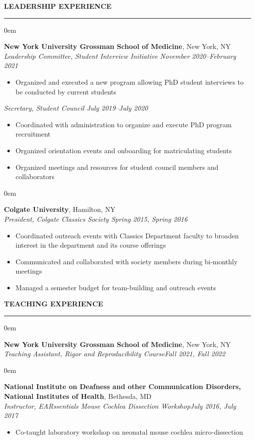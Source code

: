 \documentclass[10pt, letterpaper]{article} %
\newenvironment{CVSection}{
\begin{addmargin}[2em]{0em}
\begin{samepage}}
{\end{samepage}
\end{addmargin}\bigskip}
\newcommand{\CVHeading}[1]{
\MakeUppercase{\bf #1}
\smallskip
\hrule
\medskip
}
\begin{document}
\CVHeading{Leadership Experience}
\begin{CVSection}
\textbf{New York University Grossman School of Medicine}, New York, NY\\
\textsl{Leadership Committee, Student Interview Initiative	\hfill November 2020--February 2021}
\begin{itemize}
\item Organized and executed a new program allowing PhD student interviews to be conducted by current students
\end{itemize}
\medskip
\textsl{Secretary, Student Council	\hfill July 2019--July 2020}
\begin{itemize}
\item Coordinated with administration to organize and execute PhD program recruitment
\item Organized orientation events and onboarding for matriculating students
\item Organized meetings and resources for student council members and collaborators
\end{itemize}
\end{CVSection}
\begin{CVSection}
\textbf{Colgate University}, Hamilton, NY\\
\textsl{President, Colgate Classics Society	\hfill Spring 2015, Spring 2016}
\begin{itemize}
\item Coordinated outreach events with Classics Department faculty to broaden interest in the department and its course offerings
\item Communicated and collaborated with society members during bi-monthly meetings
\item Managed a semester budget for team-building and outreach events
\end{itemize}
\end{CVSection}

\CVHeading{Teaching Experience}
\begin{CVSection}
\textbf{New York University Grossman School of Medicine}, New York, NY\\
\textsl{Teaching Assistant, Rigor and Reproducibility Course\hfill Fall 2021, Fall 2022}

\end{CVSection}
\begin{CVSection}
\textbf{National Institute on Deafness and other Communication Disorders,\\ National Institutes of Health}, Bethesda, MD\\
\textsl{Instructor, EARssentials Mouse Cochlea Dissection Workshop\hfill July 2016, July 2017}
\begin{itemize}
\item Co-taught laboratory workshop on neonatal mouse cochlea micro-dissection
\end{itemize}
\end{CVSection}
\end{document}
